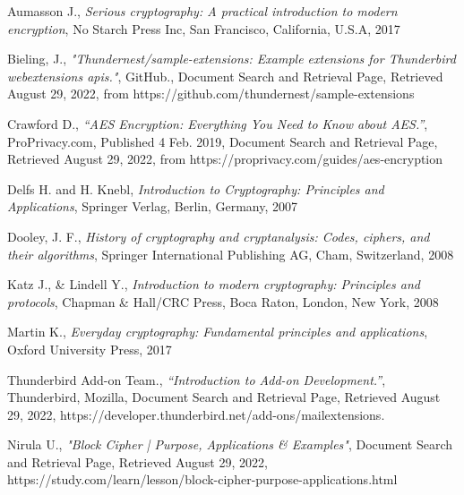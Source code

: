 \backmatter

\clearpage %
{}

\renewcommand{\bibname}{References}

\begin{thebibliography}{11}

  Aumasson J.,
  \emph{Serious cryptography: A practical introduction to modern encryption},
  No Starch Press Inc, 
  San Francisco, California, U.S.A,
  2017
  
  Bieling, J.,
  \emph{"Thundernest/sample-extensions: Example extensions for Thunderbird webextensions apis."},
  GitHub.,
  Document Search and Retrieval Page,
  Retrieved August 29, 2022, 
  from https://github.com/thundernest/sample-extensions 
  
  Crawford D.,
  \emph{“AES Encryption: Everything You Need to Know about AES.”},
   ProPrivacy.com,
   Published 4 Feb. 2019,
   Document Search and Retrieval Page,
   Retrieved August 29, 2022,
   from https://proprivacy.com/guides/aes-encryption
   
  Delfs H. and H. Knebl,
  \emph{Introduction to Cryptography: Principles and Applications},
  Springer Verlag, 
  Berlin, Germany,
  2007
  
  Dooley, J. F.,
  \emph{History of cryptography and cryptanalysis: Codes, ciphers, and their algorithms},
   Springer International Publishing AG,
   Cham, Switzerland,
   2008
    
  Katz J., \& Lindell Y.,
  \emph{Introduction to modern cryptography: Principles and protocols},
  Chapman \& Hall/CRC Press,
  Boca Raton, London, New York,
  2008
    
  Martin K.,
  \emph{Everyday cryptography: Fundamental principles and applications},
  Oxford University Press,
  2017
  
  Thunderbird Add-on Team.,
  \emph{“Introduction to Add-on Development.”},
  Thunderbird, Mozilla, 
  Document Search and Retrieval Page,
  Retrieved August 29, 2022,
  https://developer.thunderbird.net/add-ons/mailextensions.
  
  Nirula U.,
  \emph{"Block Cipher | Purpose, Applications \& Examples"},
  Document Search and Retrieval Page,
  Retrieved August 29, 2022,
  https://study.com/learn/lesson/block-cipher-purpose-applications.html
   

\end{thebibliography}

